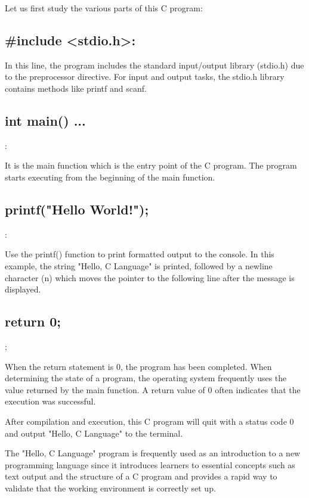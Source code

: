 \documentclass[11pt]{article}
\begin{document}



Let us first study the various parts of this C program:

\subsection{\#include <stdio.h>:}

In this line, the program includes the standard input/output library (stdio.h) due to the preprocessor directive. For input and output tasks, the stdio.h library contains methods like printf and scanf.

\subsection{int main() { ... }}:

It is the main function which is the entry point of the C program. The program starts executing from the beginning of the main function.

\subsection{printf("Hello World!");}:

Use the printf() function to print formatted output to the console. In this example, the string "Hello, C Language" is printed, followed by a newline character (n) which moves the pointer to the following line after the message is displayed.

\subsection{return 0;};

When the return statement is 0, the program has been completed. When determining the state of a program, the operating system frequently uses the value returned by the main function. A return value of 0 often indicates that the execution was successful.

After compilation and execution, this C program will quit with a status code 0 and output "Hello, C Language" to the terminal.

The "Hello, C Language" program is frequently used as an introduction to a new programming language since it introduces learners to essential concepts such as text output and the structure of a C program and provides a rapid way to validate that the working environment is correctly set up.
\end{document}
